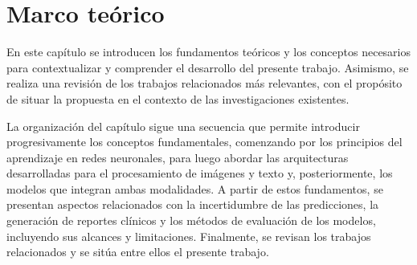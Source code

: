 \chapter[Marco teórico]{Marco teórico}
\label{cp:marco}

En este capítulo se introducen los fundamentos teóricos y los conceptos necesarios para contextualizar y
comprender el desarrollo del presente trabajo. Asimismo, se realiza una revisión de los trabajos relacionados
más relevantes, con el propósito de situar la propuesta en el contexto de las investigaciones existentes.

La organización del capítulo sigue una secuencia que permite introducir progresivamente los conceptos
fundamentales, comenzando por los principios del aprendizaje en redes neuronales, para luego abordar las
arquitecturas desarrolladas para el procesamiento de imágenes y texto y, posteriormente, los modelos que
integran ambas modalidades. A partir de estos fundamentos, se presentan aspectos relacionados con la
incertidumbre de las predicciones, la generación de reportes clínicos y los métodos de evaluación de los
modelos, incluyendo sus alcances y limitaciones. Finalmente, se revisan los trabajos relacionados y se sitúa entre
ellos el presente trabajo.








